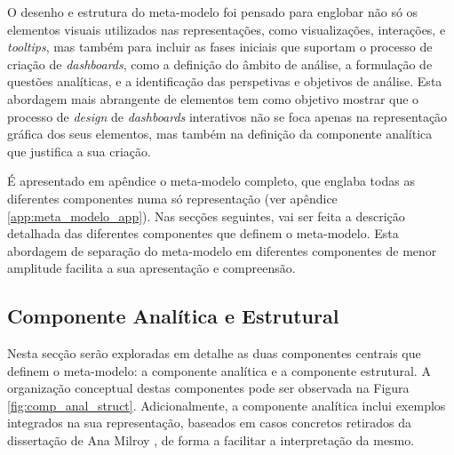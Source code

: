 O desenho e estrutura do meta-modelo foi pensado para englobar não só os elementos visuais utilizados nas representações, como visualizações, interações, e \textit{tooltips}, mas também para incluir as fases iniciais que suportam o processo de criação de \textit{dashboards}, como a definição do âmbito de análise, a formulação de questões analíticas, e a identificação das perspetivas e objetivos de análise. Esta abordagem mais abrangente de elementos tem como objetivo mostrar que o processo de \textit{design} de \textit{dashboards} interativos não se foca apenas na representação gráfica dos seus elementos, mas também na definição da componente analítica que justifica a sua criação.

É apresentado em apêndice o meta-modelo completo, que englaba todas as diferentes componentes numa só representação (ver apêndice \ref{app:meta_modelo_app}). Nas secções seguintes, vai ser feita a descrição detalhada das diferentes componentes que definem o meta-modelo. Esta abordagem de separação do meta-modelo em diferentes componentes de menor amplitude facilita a sua apresentação e compreensão.

\subsection{Componente Analítica e Estrutural} %
\label{sub:anal_struct_comp}

Nesta secção serão exploradas em detalhe as duas componentes centrais que definem o meta-modelo: a componente analítica e a componente estrutural. A organização conceptual destas componentes pode ser observada na Figura \ref{fig:comp_anal_struct}. Adicionalmente, a componente analítica inclui exemplos integrados na sua representação, baseados em casos concretos retirados da dissertação de Ana Milroy \cite{milroy2025}, de forma a facilitar a interpretação da mesmo.

